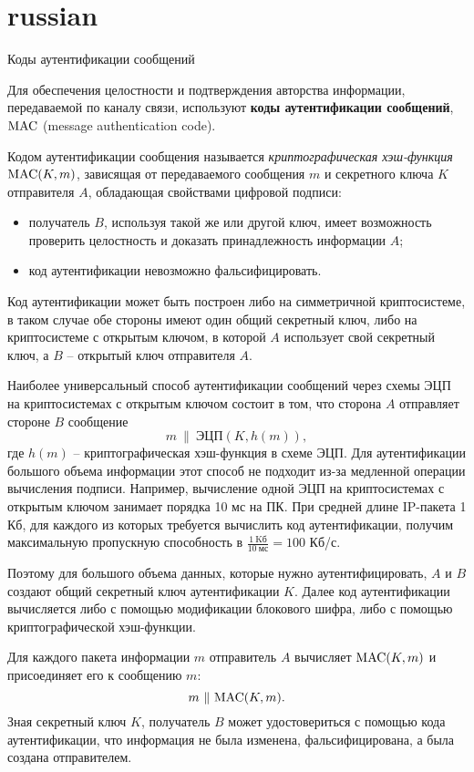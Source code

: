 \section{russian}{Коды аутентификации сообщений}

Для обеспечения целостности и подтверждения авторства информации, передаваемой по каналу связи, используют \textbf{коды аутентификации сообщений}, $\textrm{MAC}$ (message authentication code).

Кодом аутентификации сообщения называется \emph{криптографическая хэш-функция} $\textrm{MAC}(K,m)$, зависящая от передаваемого сообщения $m$ и секретного ключа $K$ отправителя $A$, обладающая свойствами цифровой подписи:
\begin{itemize}
    \item получатель $B$, используя такой же или другой ключ, имеет возможность проверить целостность и доказать принадлежность информации $A$;
    \item код аутентификации невозможно фальсифицировать.
\end{itemize}

Код аутентификации может быть построен либо на симметричной криптосистеме, в таком случае обе стороны имеют один общий секретный ключ, либо на криптосистеме с открытым ключом, в которой $A$ использует свой секретный ключ, а $B$ -- открытый ключ отправителя $A$.

Наиболее универсальный способ аутентификации сообщений через схемы ЭЦП на криптосистемах с открытым ключом состоит в том, что сторона $A$ отправляет стороне $B$ сообщение
    \[ m ~\|~ \textrm{ЭЦП}(K, h(m)), \]
где $h(m)$ -- криптографическая хэш-функция в схеме ЭЦП.  Для аутентификации большого объема информации этот способ не подходит из-за медленной операции вычисления подписи. Например, вычисление одной ЭЦП на криптосистемах с открытым ключом занимает порядка 10 мс на ПК. При средней длине IP-пакета 1 Кб, для каждого из которых требуется вычислить код аутентификации, получим максимальную пропускную способность в $\frac{1 ~ \text{Kб}}{10 ~ \text{мс}} = 100$ Кб/с.

Поэтому для большого объема данных, которые нужно аутентифицировать, $A$ и $B$ создают общий секретный ключ аутентификации $K$. Далее код аутентификации вычисляется либо с помощью модификации блокового шифра, либо с помощью криптографической хэш-функции.

Для каждого пакета информации $m$ отправитель $A$ вычисляет $\textrm{MAC}(K,m)$ и присоединяет его к сообщению $m$:
    \[ m ~ \|~ \textrm{MAC}(K,m). \]
 Зная секретный ключ $K$, получатель $B$ может удостовериться с помощью кода аутентификации, что информация не была изменена, фальсифицирована, а была создана отправителем.


